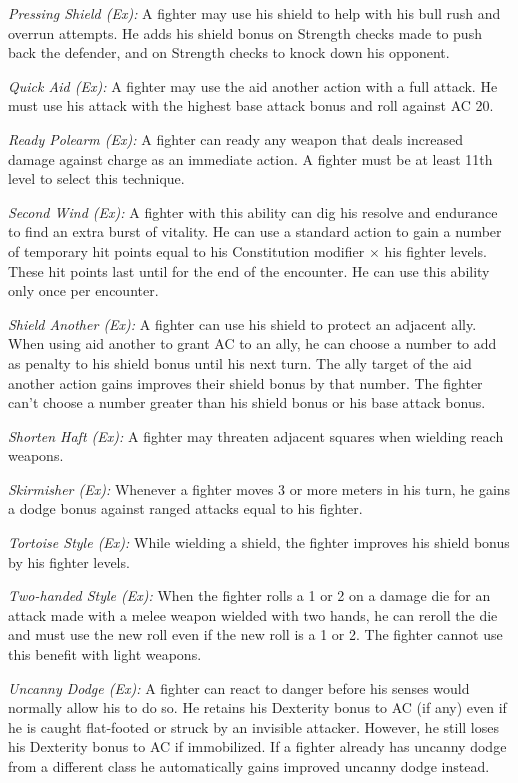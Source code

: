 \textit{Pressing Shield (Ex):} A fighter may use his shield to help with his bull rush and overrun attempts. He adds his shield bonus on Strength checks made to push back the defender, and on Strength checks to knock down his opponent.

\textit{Quick Aid (Ex):} A fighter may use the aid another action with a full attack. He must use his attack with the highest base attack bonus and roll against AC 20.

\textit{Ready Polearm (Ex):} A fighter can ready any weapon that deals increased damage against charge as an immediate action. A fighter must be at least 11th level to select this technique.

\textit{Second Wind (Ex):} A fighter with this ability can dig his resolve and endurance to find an extra burst of vitality. He can use a standard action to gain a number of temporary hit points equal to his Constitution modifier $\times$ his fighter levels. These hit points last until for the end of the encounter. He can use this ability only once per encounter.

\textit{Shield Another (Ex):} A fighter can use his shield to protect an adjacent ally. When using aid another to grant AC to an ally, he can choose a number to add as penalty to his shield bonus until his next turn. The ally target of the aid another action gains improves their shield bonus by that number. The fighter can't choose a number greater than his shield bonus or his base attack bonus.

\textit{Shorten Haft (Ex):} A fighter may threaten adjacent squares when wielding reach weapons.

\textit{Skirmisher (Ex):} Whenever a fighter moves 3 or more meters in his turn, he gains a dodge bonus against ranged attacks equal to \onequarter his fighter.

\textit{Tortoise Style (Ex):} While wielding a shield, the fighter improves his shield bonus by \onequarter his fighter levels.

\textit{Two-handed Style (Ex):} When the fighter rolls a 1 or 2 on a damage die for an attack made with a melee weapon wielded with two hands, he can reroll the die and must use the new roll even if the new roll is a 1 or 2. The fighter cannot use this benefit with light weapons.

\textit{Uncanny Dodge (Ex):} A fighter can react to danger before his senses would normally allow his to do so. He retains his Dexterity bonus to AC (if any) even if he is caught flat-footed or struck by an invisible attacker. However, he still loses his Dexterity bonus to AC if immobilized. If a fighter already has uncanny dodge from a different class he automatically gains improved uncanny dodge instead.

